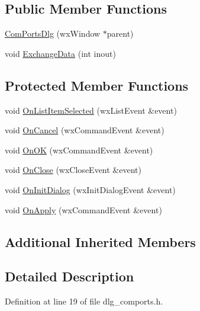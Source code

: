 \subsection*{Public Member Functions}
\begin{DoxyCompactItemize}
\item 
\hyperlink{class_com_ports_dlg_a02f8415185ed657f0263ae795e2b4f04}{Com\-Ports\-Dlg} (wx\-Window $\ast$parent)
\item 
void \hyperlink{class_com_ports_dlg_a767cb0ffb8904e2bb95500984f1b7025}{Exchange\-Data} (int inout)
\end{DoxyCompactItemize}
\subsection*{Protected Member Functions}
\begin{DoxyCompactItemize}
\item 
void \hyperlink{class_com_ports_dlg_ad67143fe5e75a4afef411b679a0247ca}{On\-List\-Item\-Selected} (wx\-List\-Event \&event)
\item 
void \hyperlink{class_com_ports_dlg_a2afc9d2402a3f971c0ec53116783731b}{On\-Cancel} (wx\-Command\-Event \&event)
\item 
void \hyperlink{class_com_ports_dlg_ac3f80f2b8484c4c0c4c67b0ccafe8372}{On\-O\-K} (wx\-Command\-Event \&event)
\item 
void \hyperlink{class_com_ports_dlg_a225c9dca5215e98c3a043e155544f668}{On\-Close} (wx\-Close\-Event \&event)
\item 
void \hyperlink{class_com_ports_dlg_a3aa2fdeb96961e66d30b1012fbe09741}{On\-Init\-Dialog} (wx\-Init\-Dialog\-Event \&event)
\item 
void \hyperlink{class_com_ports_dlg_a219708df39be6ec6aa33548e621ed263}{On\-Apply} (wx\-Command\-Event \&event)
\end{DoxyCompactItemize}
\subsection*{Additional Inherited Members}


\subsection{Detailed Description}


Definition at line 19 of file dlg\-\_\-comports.\-h.



